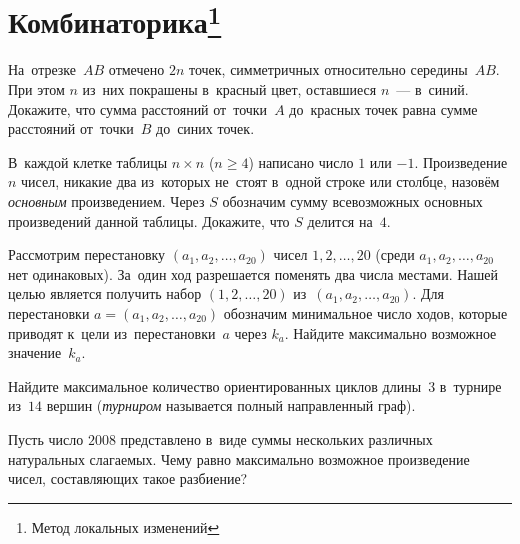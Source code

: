 

\section*{Комбинаторика\footnote{Метод локальных изменений}}


\begin{problems}

На~отрезке~$AB$ отмечено $2n$ точек, симметричных относительно середины~$AB$.
При этом $n$ из~них покрашены в~красный цвет, оставшиеся $n$~--- в~синий.
Докажите, что сумма расстояний от~точки~$A$ до~красных точек равна сумме
расстояний от~точки~$B$ до~синих точек.

\item
В~каждой клетке таблицы $n \times n$ ($n \geq 4$) написано число $1$ или $-1$.
Произведение $n$ чисел, никакие два из~которых не~стоят в~одной строке или
столбце, назовём \emph{основным} произведением.
Через $S$ обозначим сумму всевозможных основных произведений данной
таблицы.
Докажите, что $S$ делится на~$4$.

\item
Рассмотрим перестановку $(a_1, a_2, \ldots, a_{20})$ чисел $1, 2, \ldots, 20$
(среди $a_1, a_2, \ldots, a_{20}$ нет одинаковых).
За~один ход разрешается поменять два числа местами.
Нашей целью является получить набор $(1, 2, \ldots, 20)$
из~$(a_1,a_2, \ldots, a_{20})$.
Для перестановки $a = (a_1, a_2, \ldots, a_{20})$ обозначим минимальное число
ходов, которые приводят к~цели из~перестановки~$a$ через $k_a$.
Найдите максимально возможное значение~$k_a$.

\item
Найдите максимальное количество ориентированных циклов длины~$3$ в~турнире
из~$14$ вершин (\emph{турниром} называется полный направленный граф).

\item
Пусть число $2008$ представлено в~виде суммы нескольких различных натуральных
слагаемых.
Чему равно максимально возможное произведение чисел, составляющих такое
разбиение?

\end{problems}


